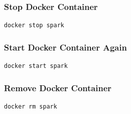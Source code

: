 \subsubsection{Stop Docker Container}

\begin{lstlisting}
docker stop spark
\end{lstlisting}

\subsubsection{Start Docker Container Again}

\begin{lstlisting}
docker start spark
\end{lstlisting}

\subsubsection{Remove Docker Container}

\begin{lstlisting}
docker rm spark
\end{lstlisting}

